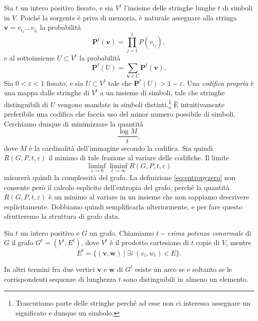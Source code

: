 Sia \(t\) un intero positivo fissato, e sia \(V^t\) l'insieme delle stringhe lunghe \(t\) di simboli in \(V\). Poiché la sorgente è priva di memoria, è naturale assegnare alla stringa \(\mathbf{v} = v_{i_1}\dots v_{i_t}\) la probabilità 
\begin{equation}
	\label{eq:probability}\mathbf{P}^t(\mathbf{v})=\prod_{j=1}^t P(v_{i_j}), 
\end{equation}
e al sottoinsieme \(U\subset V^{t}\) la probabilit\`a 
\begin{equation}
	\mathbf{P}^t(U)=\sum_{\mathbf{v}\in U} {\mathbf{P}^t(\mathbf{v})}. \nonumber 
\end{equation}
Sia \(0<\varepsilon<1\) fissato, e sia \(U\subset V^{t}\) tale che \(\mathbf{P}^t(U)>1-\varepsilon\). Una \emph{codifica propria} \`e una mappa dalle stringhe di \(V^t\) a un insieme di simboli, tale che stringhe distinguibili di \(U\) vengono mandate in simboli distinti.\footnote{Trascuriamo parte delle stringhe perché ad esse non ci interessa assegnare un significato e dunque un simbolo.} \`E intuitivamente preferibile una codifica che faccia uso del minor numero possibile di simboli. Cerchiamo dunque di minimizzare la quantit\`a 
\begin{equation}
	\frac{\log{M}}{t}, \nonumber 
\end{equation}
dove \(M\) \`e la cardinalit\`a dell'immagine secondo la codifica. Sia quindi \(R(G,P,t,\varepsilon)\) il minimo di tale frazione al variare delle codifiche. Il limite 
\begin{equation}
	\label{eq:entropyzero} \liminf_{\varepsilon \to 0} \liminf_{t \to \infty} R(G,P,t,\varepsilon) 
\end{equation}
misurerà quindi la complessità del grafo. La definizione \eqref{eq:entropyzero} non consente però il calcolo esplicito dell'entropia del grafo, perché la quantità \(R(G,P,t,\varepsilon)\) è un minimo al variare in un insieme che non sappiamo descrivere esplicitamente. Dobbiamo quindi semplificarla ulteriormente, e per fare questo sfrutteremo la struttura di grafo data. 
\begin{definition}
	Sia \(t\) un intero positivo e \(G\) un grafo. Chiamiamo \emph{\(t-\)esima potenza conormale} di \(G\) il grafo \(G^t=(V^t, E^t)\), dove \(V^t\) è il prodotto cartesiano di \(t\) copie di \(V\), mentre
	\[E^t=\{(\mathbf{v},\mathbf{w})\ \vert\ \exists i\ (v_i, w_i)\in E\}.\]
\end{definition}
In altri termini fra due vertici \(\mathbf{v}\) e \(\mathbf{w}\) di \(G^t\) esiste un arco se e soltanto se le corrispondenti sequenze di lunghezza \(t\) sono distinguibili in almeno un elemento. 
